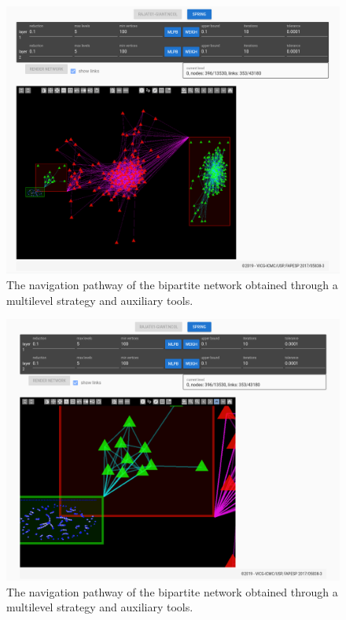 \documentclass[runningheads]{llncs}
\begin{document}
\begin{figure}[!h]\centering
 \includegraphics[width=\textwidth]{fpage0}
  \caption{The navigation pathway of the bipartite network obtained through a multilevel strategy
  and auxiliary tools.
  }\label{fpage0}
\end{figure}

\begin{figure}[!h]\centering
 \includegraphics[width=\textwidth]{fpage}
  \caption{The navigation pathway of the bipartite network obtained through a multilevel strategy
  and auxiliary tools.
  }\label{fpage}
\end{figure}
\end{document}
